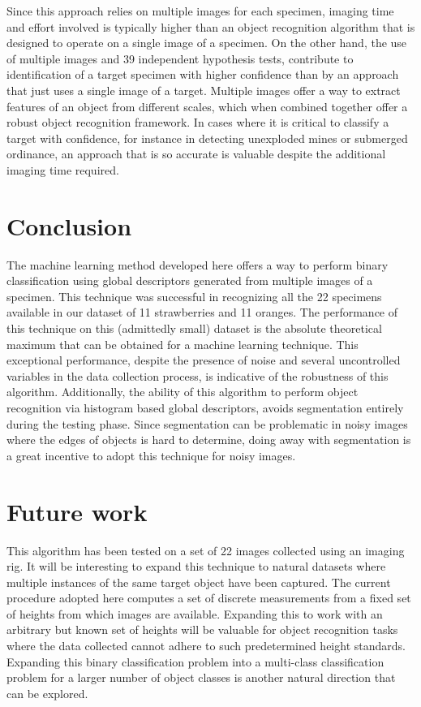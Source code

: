 Since this approach relies on multiple images for each specimen, imaging time and effort involved is typically higher than an object recognition algorithm that is designed to operate on a single image of a specimen. On the other hand, the use of multiple images and 39 independent hypothesis tests, contribute to identification of a target specimen with higher confidence than by an approach that just uses a single image of a target. Multiple images offer a way to extract features of an object from different scales, which when combined together offer a robust object recognition framework. In cases where it is critical to classify a target with confidence, for instance in detecting unexploded mines or submerged ordinance, an approach that is so accurate is  valuable despite the additional imaging time required.

\section{Conclusion}

The machine learning method developed here offers a way to perform binary classification using global descriptors generated from multiple images of a specimen. This technique was successful in recognizing all the 22 specimens available in our dataset of 11 strawberries and 11 oranges. The performance of this technique on this (admittedly small) dataset is the absolute theoretical maximum that can be obtained for a machine learning technique. This exceptional performance, despite the presence of noise and several uncontrolled variables in the data collection process, is indicative of the robustness of this algorithm. Additionally, the ability of this algorithm to perform object recognition via histogram based global descriptors, avoids segmentation entirely during the testing phase. Since segmentation can be problematic in noisy images where the edges of objects is hard to determine, doing away with segmentation is a great incentive to adopt this technique for noisy images.
\section{Future work}

This algorithm has been tested on a set of 22 images collected using an imaging rig. It will be interesting to expand this technique to natural datasets where multiple instances of the same target object have been captured. The current procedure adopted here computes a set of discrete measurements from a fixed set of heights from which images are available. Expanding this to work with an arbitrary but known set of heights will be valuable for object recognition tasks where the data collected cannot adhere to such predetermined height standards. Expanding this binary classification problem into a multi-class classification problem for a larger number of object classes is another natural direction that can be explored.



